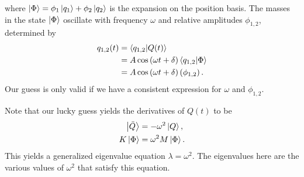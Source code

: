 \documentclass[10pt]{mypackage}
\begin{document}
where $\ket{\Phi} = \phi_1\ket{q_1} + \phi_2\ket{q_2}$ is the expansion on the position basis. The masses in the state $\ket{\Phi}$ oscillate with frequency $\omega$ and relative amplitudes $\phi_{1,2}$, determined by
\begin{align*}
  q_{1,2}(t) &= \braket{q_{1,2}}{Q(t)}\\
             &= A\cos\left(\omega t + \delta\right)\braket{q_{1,2}}{\Phi}\\
             &= A\cos\left(\omega t + \delta\right)\left(\phi_{1,2}\right).
\end{align*}
Our guess is only valid if we have a consistent expression for $\omega$ and $\phi_{1,2}$.\newline

Note that our lucky guess yields the derivatives of $Q(t)$ to be
\begin{align*}
  \ket{\ddot{Q}} &= -\omega^2\ket{Q},\\
  K\ket{\Phi} &= \omega^2M\ket{\Phi}.
\end{align*}
This yields a generalized eigenvalue equation $\lambda = \omega^2$. The eigenvalues here are the various values of $\omega^2$ that satisfy this equation.
\end{document}
